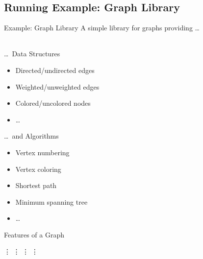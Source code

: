 \subsection{Running Example: Graph Library}


\begin{frame}{Example: Graph Library}
	A simple library for graphs providing \ldots\\~\\
	\begin{fancycolumns}[t]
		\begin{example}{\ldots\ Data Structures}
			\begin{itemize}
				\item Directed/undirected edges
				\item Weighted/unweighted edges 
				\item Colored/uncolored nodes
				\item \ldots
			\end{itemize}
		\end{example}
	\nextcolumn
		\begin{example}{\ldots\ and Algorithms}
			\begin{itemize}
				\item Vertex numbering
				\item Vertex coloring 
				\item Shortest path
				\item Minimum spanning tree 
				\item \ldots
			\end{itemize}
		\end{example}
	\end{fancycolumns}
\end{frame}

\begin{frame}{Features of a Graph}
	\begin{fancycolumns}[t,columns=4]
		\centering\Huge\vdots
	\nextcolumn
		\centering\Huge\vdots
	\nextcolumn
		\centering\Huge\vdots
	\nextcolumn
		\centering\Huge\vdots
	\end{fancycolumns}
\end{frame}

